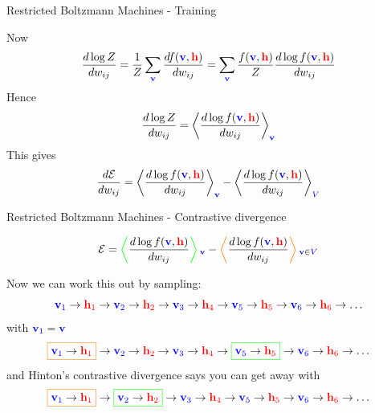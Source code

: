 \documentclass{beamer}
\newcommand{\vbf}{\color{blue}\mathbf{v}\color{black}}
\newcommand{\hbf}{\color{red}\mathbf{h}\color{black}}
\newcommand{\bigv}{\color{blue}V\color{black}}
\newcommand{\cor}{\color{reddish}{}}
\newcommand{\cob}{\color{black}{}}
\begin{document}
\begin{frame}{Restricted Boltzmann Machines - Training}

  \cor{}Now\cob{}
  $$
  \frac{d\log{Z}}{dw_{ij}}=\frac{1}{Z}\sum_{\vbf}\frac{d f(\vbf,\hbf)}{dw_{ij}}= \sum_{\vbf}\frac{f(\vbf,\hbf)}{Z}\frac{d \log{f(\vbf,\hbf)}}{dw_{ij}} 
  $$
  \cor{}Hence\cob{}
  $$
  \frac{d\log{Z}}{dw_{ij}}=\left\langle\frac{d \log{f(\vbf,\hbf)}}{dw_{ij}}\right\rangle_{\vbf} 
  $$
  \cor{}This gives\cob{}
  $$
  \frac{d\mathcal{E}}{dw_{ij}}=\left\langle\frac{d \log{f(\vbf,\hbf)}}{dw_{ij}}\right\rangle_{\vbf} -\left\langle\frac{d \log{f(\vbf,\hbf)}}{dw_{ij}}\right\rangle_{\bigv}
  $$
  \end{frame}


\begin{frame}{Restricted Boltzmann Machines - Contrastive divergence}

  $$
  \mathcal{E}=\color{green}\left\langle\color{black}\frac{d \log{f(\vbf,\hbf)}}{dw_{ij}}\color{green}\right\rangle_{\vbf}\color{black}{} -\color{orange}\left\langle\color{black}\frac{d \log{f(\vbf,\hbf)}}{dw_{ij}}\color{orange}\right\rangle\color{black}_{\vbf\in\bigv}
  $$
  
  \cor{}Now we can work this out by sampling:
  $$
  \color{blue}\mathbf{v}_1\color{black}\rightarrow\color{red}\mathbf{h}_1\color{black}\rightarrow
  \color{blue}\mathbf{v}_2\color{black}\rightarrow\color{red}\mathbf{h}_2\color{black}\rightarrow
  \color{blue}\mathbf{v}_3\color{black}\rightarrow\color{red}\mathbf{h}_4\color{black}\rightarrow
  \color{blue}\mathbf{v}_5\color{black}\rightarrow\color{red}\mathbf{h}_5\color{black}\rightarrow
  \color{blue}\mathbf{v}_6\color{black}\rightarrow\color{red}\mathbf{h}_6\color{black}\rightarrow\ldots
  $$
\cor{}with\cob{} $\color{blue}\mathbf{v}_1\color{black}=\vbf$\cob{}
  $$
  \color{orange}\boxed{\color{blue}\mathbf{v}_1\color{black}\rightarrow
  \color{red}\mathbf{h}_1\color{black}}\color{black}\rightarrow\color{blue}\mathbf{v}_2\color{black}
  \rightarrow\color{red}\mathbf{h}_2\color{black}\rightarrow
  \color{blue}\mathbf{v}_3\color{black}\rightarrow\color{red}\mathbf{h}_4\color{black}\rightarrow
  \color{green}\boxed{\color{blue}\mathbf{v}_5\color{black}\rightarrow\color{red}\mathbf{h}_5\color{black}}\color{black}\rightarrow
  \color{blue}\mathbf{v}_6\color{black}\rightarrow\color{red}\mathbf{h}_6\color{black}\rightarrow\ldots
 $$
\cor{}and Hinton's contrastive divergence says you can get away with  
  $$
  \color{orange}\boxed{\color{blue}\mathbf{v}_1\color{black}\rightarrow
  \color{red}\mathbf{h}_1\color{black}}\color{black}\rightarrow \color{green}\boxed{\color{blue}\mathbf{v}_2\color{black}
  \rightarrow\color{red}\mathbf{h}_2\color{black}}\color{black}\rightarrow
  \color{blue}\mathbf{v}_3\color{black}\rightarrow\color{red}\mathbf{h}_4\color{black}\rightarrow
  \color{blue}\mathbf{v}_5\color{black}\rightarrow\color{red}\mathbf{h}_5\color{black}\rightarrow
  \color{blue}\mathbf{v}_6\color{black}\rightarrow\color{red}\mathbf{h}_6\color{black}\rightarrow\ldots
  $$

  \end{frame}
\end{document}
